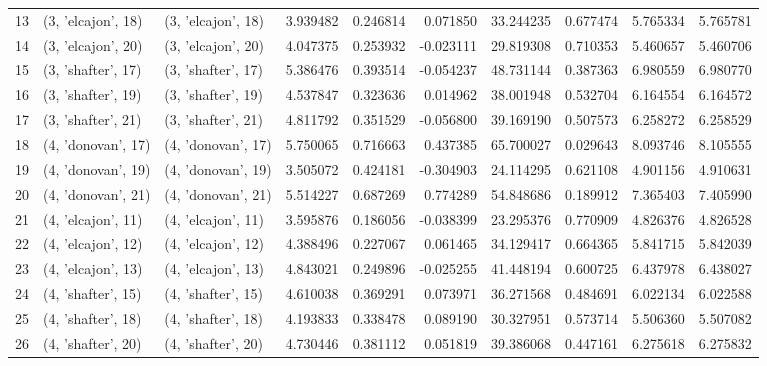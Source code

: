 \begin{tabular}{lllrrrrrrr}
13 &  (3, 'elcajon', 18) &  (3, 'elcajon', 18) &  3.939482 &   0.246814 &  0.071850 &   33.244235 &  0.677474 &   5.765334 &   5.765781 \\
14 &  (3, 'elcajon', 20) &  (3, 'elcajon', 20) &  4.047375 &   0.253932 & -0.023111 &   29.819308 &  0.710353 &   5.460657 &   5.460706 \\
15 &  (3, 'shafter', 17) &  (3, 'shafter', 17) &  5.386476 &   0.393514 & -0.054237 &   48.731144 &  0.387363 &   6.980559 &   6.980770 \\
16 &  (3, 'shafter', 19) &  (3, 'shafter', 19) &  4.537847 &   0.323636 &  0.014962 &   38.001948 &  0.532704 &   6.164554 &   6.164572 \\
17 &  (3, 'shafter', 21) &  (3, 'shafter', 21) &  4.811792 &   0.351529 & -0.056800 &   39.169190 &  0.507573 &   6.258272 &   6.258529 \\
18 &  (4, 'donovan', 17) &  (4, 'donovan', 17) &  5.750065 &   0.716663 &  0.437385 &   65.700027 &  0.029643 &   8.093746 &   8.105555 \\
19 &  (4, 'donovan', 19) &  (4, 'donovan', 19) &  3.505072 &   0.424181 & -0.304903 &   24.114295 &  0.621108 &   4.901156 &   4.910631 \\
20 &  (4, 'donovan', 21) &  (4, 'donovan', 21) &  5.514227 &   0.687269 &  0.774289 &   54.848686 &  0.189912 &   7.365403 &   7.405990 \\
21 &  (4, 'elcajon', 11) &  (4, 'elcajon', 11) &  3.595876 &   0.186056 & -0.038399 &   23.295376 &  0.770909 &   4.826376 &   4.826528 \\
22 &  (4, 'elcajon', 12) &  (4, 'elcajon', 12) &  4.388496 &   0.227067 &  0.061465 &   34.129417 &  0.664365 &   5.841715 &   5.842039 \\
23 &  (4, 'elcajon', 13) &  (4, 'elcajon', 13) &  4.843021 &   0.249896 & -0.025255 &   41.448194 &  0.600725 &   6.437978 &   6.438027 \\
24 &  (4, 'shafter', 15) &  (4, 'shafter', 15) &  4.610038 &   0.369291 &  0.073971 &   36.271568 &  0.484691 &   6.022134 &   6.022588 \\
25 &  (4, 'shafter', 18) &  (4, 'shafter', 18) &  4.193833 &   0.338478 &  0.089190 &   30.327951 &  0.573714 &   5.506360 &   5.507082 \\
26 &  (4, 'shafter', 20) &  (4, 'shafter', 20) &  4.730446 &   0.381112 &  0.051819 &   39.386068 &  0.447161 &   6.275618 &   6.275832 \\
\bottomrule
\end{tabular}
